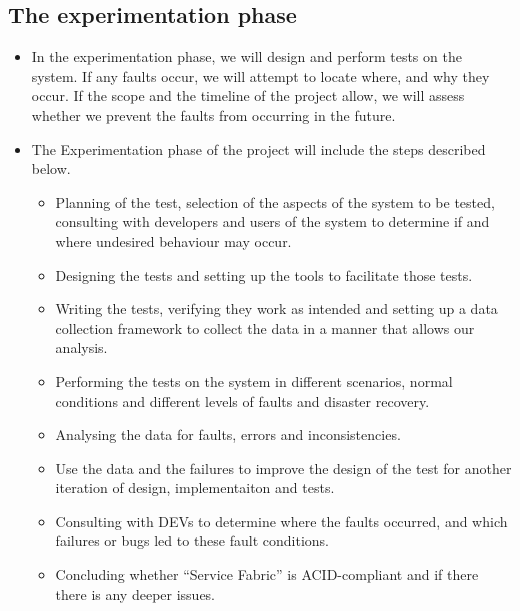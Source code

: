 \subsection{The experimentation phase}
\begin{itemize}
\item	In the experimentation phase, we will design and perform tests on the system. If any faults occur, we will attempt to locate where, and why they occur. If the scope and the timeline of the project allow, we will assess whether we prevent the faults from occurring in the future.
\item	The Experimentation phase of the project will include the steps described below. 
\begin{itemize}
\item	Planning of the test, selection of the aspects of the system to be tested, consulting with developers and users of the system to determine if and where undesired behaviour may occur.
\item	Designing the tests and setting up the tools to facilitate those tests.
\item	Writing the tests, verifying they work as intended and setting up a data collection framework to collect the data in a manner that allows our analysis.
\item	Performing the tests on the system in different scenarios, normal conditions and different levels of faults and disaster recovery.
\item	Analysing the data for faults, errors and inconsistencies.
\item Use the data and the failures to improve the design of the test for another iteration of design, implementaiton and tests.
\item	Consulting with DEVs to determine where the faults occurred, and which failures or bugs led to these fault conditions.
\item	Concluding whether “Service Fabric” is ACID-compliant and if there there is any deeper issues.
\end{itemize}
\end{itemize}

